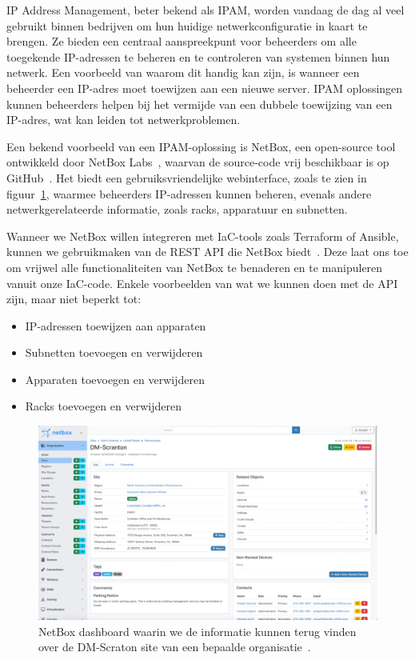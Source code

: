 IP Address Management, beter bekend als IPAM, worden vandaag de dag al veel gebruikt binnen bedrijven om hun huidige netwerkconfiguratie in kaart te brengen.
Ze bieden een centraal aanspreekpunt voor beheerders om alle toegekende IP-adressen te beheren en te controleren van systemen binnen hun netwerk.
Een voorbeeld van waarom dit handig kan zijn, is wanneer een beheerder een IP-adres moet toewijzen aan een nieuwe server.
IPAM oplossingen kunnen beheerders helpen bij het vermijde van een dubbele toewijzing van een IP-adres, wat kan leiden tot netwerkproblemen.

Een bekend voorbeeld van een IPAM-oplossing is NetBox, een open-source tool ontwikkeld door NetBox Labs~\autocite{netbox-ipam}, waarvan de source-code vrij beschikbaar is op GitHub~\autocite{netbox-github}.
Het biedt een gebruiksvriendelijke webinterface, zoals te zien in figuur~\ref{fig:netbox-dashboard}, waarmee beheerders IP-adressen kunnen beheren, evenals andere netwerkgerelateerde informatie, zoals racks, apparatuur en subnetten.

Wanneer we NetBox willen integreren met IaC-tools zoals Terraform of Ansible, kunnen we gebruikmaken van de REST API die NetBox biedt~\autocite{netbox-api}.
Deze laat ons toe om vrijwel alle functionaliteiten van NetBox te benaderen en te manipuleren vanuit onze IaC-code.
Enkele voorbeelden van wat we kunnen doen met de API zijn, maar niet beperkt tot:

\begin{itemize}
    \item IP-adressen toewijzen aan apparaten
    \item Subnetten toevoegen en verwijderen
    \item Apparaten toevoegen en verwijderen
    \item Racks toevoegen en verwijderen
\end{itemize}

\begin{figure}[h!]
    \includegraphics[width=\textwidth]
    {./graphics/netbox-dashboard.png}
    \caption{\label{fig:netbox-dashboard}NetBox dashboard waarin we de informatie kunnen terug vinden over de DM-Scraton site van een bepaalde organisatie~\autocite{netbox-dashboard}.}
\end{figure}

